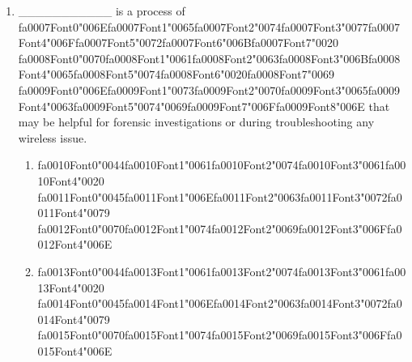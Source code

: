 \documentclass[12pt]{article}
\begin{document}
\begin{enumerate}[label=\arabic*.]
\begin{enumerate}[label=(\alph*)]
\end{enumerate}
\item \_\_\_\_\_\_\_\_\_\_\_ is a process of {\csname fa0007Font0\endcsname\char"006E}{\csname fa0007Font1\endcsname\char"0065}{\csname fa0007Font2\endcsname\char"0074}{\csname fa0007Font3\endcsname\char"0077}{\csname fa0007Font4\endcsname\char"006F}{\csname fa0007Font5\endcsname\char"0072}{\csname fa0007Font6\endcsname\char"006B}{\csname fa0007Font7\endcsname\char"0020} {\csname fa0008Font0\endcsname\char"0070}{\csname fa0008Font1\endcsname\char"0061}{\csname fa0008Font2\endcsname\char"0063}{\csname fa0008Font3\endcsname\char"006B}{\csname fa0008Font4\endcsname\char"0065}{\csname fa0008Font5\endcsname\char"0074}{\csname fa0008Font6\endcsname\char"0020}{\csname fa0008Font7\endcsname\char"0069} {\csname fa0009Font0\endcsname\char"006E}{\csname fa0009Font1\endcsname\char"0073}{\csname fa0009Font2\endcsname\char"0070}{\csname fa0009Font3\endcsname\char"0065}{\csname fa0009Font4\endcsname\char"0063}{\csname fa0009Font5\endcsname\char"0074}{\char"0069}{\csname fa0009Font7\endcsname\char"006F}{\csname fa0009Font8\endcsname\char"006E} that may be helpful for forensic investigations or during troubleshooting any wireless issue.
\begin{enumerate}[label=(\alph*)]
    \item {\csname fa0010Font0\endcsname\char"0044}{\csname fa0010Font1\endcsname\char"0061}{\csname fa0010Font2\endcsname\char"0074}{\csname fa0010Font3\endcsname\char"0061}{\csname fa0010Font4\endcsname\char"0020} {\csname fa0011Font0\endcsname\char"0045}{\csname fa0011Font1\endcsname\char"006E}{\csname fa0011Font2\endcsname\char"0063}{\csname fa0011Font3\endcsname\char"0072}{\csname fa0011Font4\endcsname\char"0079} {\csname fa0012Font0\endcsname\char"0070}{\csname fa0012Font1\endcsname\char"0074}{\csname fa0012Font2\endcsname\char"0069}{\csname fa0012Font3\endcsname\char"006F}{\csname fa0012Font4\endcsname\char"006E}
    \item {\csname fa0013Font0\endcsname\char"0044}{\csname fa0013Font1\endcsname\char"0061}{\csname fa0013Font2\endcsname\char"0074}{\csname fa0013Font3\endcsname\char"0061}{\csname fa0013Font4\endcsname\char"0020} {\csname fa0014Font0\endcsname\char"0045}{\csname fa0014Font1\endcsname\char"006E}{\csname fa0014Font2\endcsname\char"0063}{\csname fa0014Font3\endcsname\char"0072}{\csname fa0014Font4\endcsname\char"0079} {\csname fa0015Font0\endcsname\char"0070}{\csname fa0015Font1\endcsname\char"0074}{\csname fa0015Font2\endcsname\char"0069}{\csname fa0015Font3\endcsname\char"006F}{\csname fa0015Font4\endcsname\char"006E}

\end{enumerate}
\end{enumerate}
\end{document}
